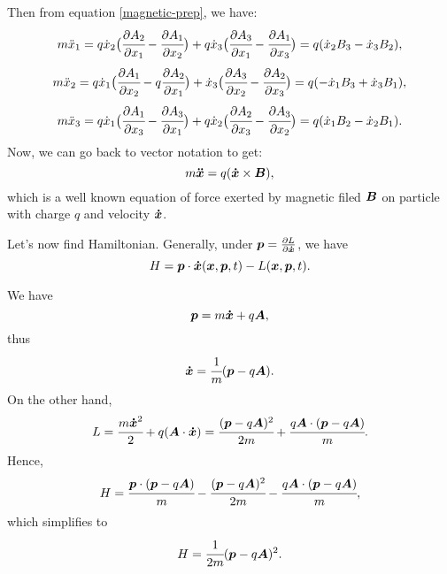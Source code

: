\documentclass[main.tex]{subfiles}
\begin{document}
Then from equation \ref{magnetic-prep}, we have:
\begin{equation}
m \ddot{x}_1 = q\dot{x}_2 \big(\cfrac{\partial A_2}{\partial x_1} - \cfrac{\partial A_1}{\partial x_2}\big) + q\dot{x}_3 \big(\cfrac{\partial A_3}{\partial x_1} - \cfrac{\partial A_1}{\partial x_3}\big) = q(\dot{x}_2 B_3 - \dot{x}_3 B_2),
\end{equation}
\begin{equation}
m \ddot{x}_2 = q\dot{x}_1 \big(\cfrac{\partial A_1}{\partial x_2} - q\cfrac{\partial A_2}{\partial x_1}\big) + \dot{x}_3 \big(\cfrac{\partial A_3}{\partial x_2} - \cfrac{\partial A_2}{\partial x_3}\big) = q(-\dot{x}_1 B_3  + \dot{x}_3 B_1),
\end{equation}
\begin{equation}
m \ddot{x}_3 = q\dot{x}_1 \big(\cfrac{\partial A_1}{\partial x_3} - \cfrac{\partial A_3}{\partial x_1}\big) + q\dot{x}_2 \big(\cfrac{\partial A_2}{\partial x_3} - \cfrac{\partial A_3}{\partial x_2}\big) = q(\dot{x}_1 B_2 - \dot{x}_2 B_1).
\end{equation}
Now, we can go back to vector notation to get:
\begin{equation}
m\boldsymbol{\ddot{x}} = q(\boldsymbol{\dot{x}} \times \boldsymbol{B}),
\end{equation}
which is a well known equation of force exerted by magnetic filed $\boldsymbol{B}$ on particle with charge $q$ and velocity $\boldsymbol{\dot{x}}$.

Let's now find Hamiltonian. Generally, under $\boldsymbol{p} = \frac{\partial L}{\partial \boldsymbol{\dot{x}}}$, we have
\begin{equation}
H = \boldsymbol{p} \cdot \boldsymbol{\dot{x}}(\boldsymbol{x}, \boldsymbol{p}, t) - L(\boldsymbol{x}, \boldsymbol{p}, t). 
\end{equation}

We have
\begin{equation}
\boldsymbol{p} = m\boldsymbol{\dot{x}} + q\boldsymbol{A},
\end{equation}
thus
\begin{equation}
\boldsymbol{\dot{x}} = \cfrac{1}{m} (\boldsymbol{p} - q\boldsymbol{A}).
\end{equation} 
On the other hand,
\begin{equation}
L = \cfrac{m\boldsymbol{\dot{x}}^2}{2} + q(\boldsymbol{A}\cdot\boldsymbol{\dot{x}}) 
= \cfrac{(\boldsymbol{p} - q\boldsymbol{A})^2}{2m} + \cfrac{q\boldsymbol{A}\cdot(\boldsymbol{p} - q\boldsymbol{A})}{m}.
\end{equation}
Hence,
\begin{equation}
H = \cfrac{\boldsymbol{p}\cdot (\boldsymbol{p} - q\boldsymbol{A})}{m} - \cfrac{(\boldsymbol{p} - q\boldsymbol{A})^2}{2m} - \cfrac{q\boldsymbol{A}\cdot(\boldsymbol{p} - q\boldsymbol{A})}{m},
\end{equation}
which simplifies to
\begin{equation}
H = \cfrac{1}{2m}(\boldsymbol{p} - q\boldsymbol{A})^2.
\end{equation}
\end{document}
